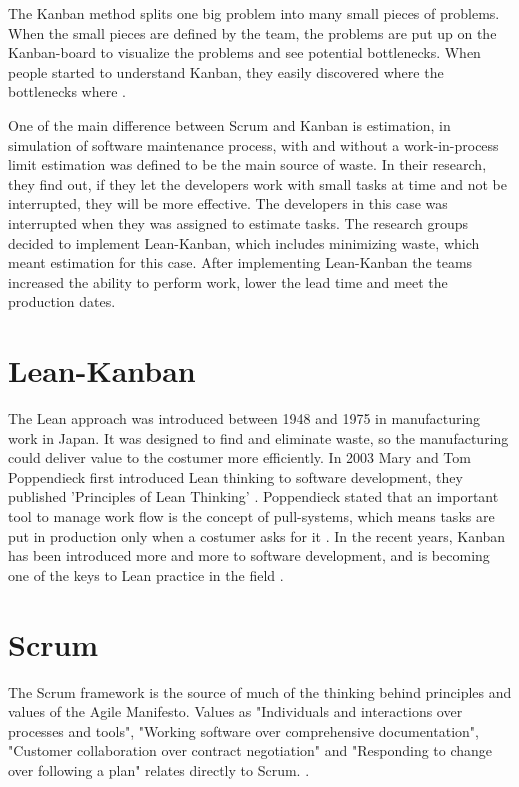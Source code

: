 \documentclass[UKenglish]{ifimaster}  %
\begin{document}
The Kanban method splits one big problem into many small pieces of problems. When the small pieces are defined by the team, the problems are put up on the Kanban-board to visualize the problems and see potential bottlenecks. When people started to understand Kanban, they easily discovered where the bottlenecks where \parencite{Shinkle}.


One of the main difference between Scrum and Kanban is estimation, in simulation of software maintenance process, with and without a work-in-process limit \parencite{SMR:SMR1599} estimation was defined to be the main source of waste. In their research, they find out, if they let the developers work with small tasks at time and not be interrupted, they will be more effective. The developers in this case was interrupted when they was assigned to estimate tasks. The research groups decided to implement Lean-Kanban, which includes minimizing waste, which meant estimation for this case. After implementing Lean-Kanban the teams increased the ability to perform work, lower the lead time and meet the production dates.

\section {Lean-Kanban}
The Lean approach was introduced between 1948 and 1975 in manufacturing work in Japan. It was designed to find and eliminate waste, so the manufacturing could deliver value to the costumer more efficiently. In 2003 Mary and Tom Poppendieck first introduced Lean thinking to software development, they published 'Principles of Lean Thinking' \parencite{Lean:2003}. Poppendieck stated that an important tool to manage work flow is the concept of pull-systems, which means tasks are put in production only when a costumer asks for it \parencite{Lean:2009}.
In the recent years, Kanban has been introduced more and more to software development, and is becoming one of the keys to Lean practice in the field \parencite{DavidAnderson}. 

\section {Scrum}
The Scrum framework is the source of much of the thinking behind principles and values of the Agile Manifesto. Values as "Individuals and interactions over processes and tools", "Working software over comprehensive documentation", "Customer collaboration over contract negotiation" and "Responding to change over following a plan" relates directly to Scrum. \parencite{Scrum}.
\end{document}
